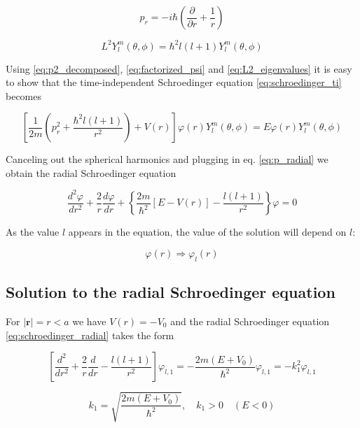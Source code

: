 \documentclass{article}
\begin{document}
\begin{equation}
\label{eq:p_radial}
p_{r} = -i\hbar \left( \frac{\partial}{\partial r} + \frac{1}{r} \right)
\end{equation}

\begin{equation}
\label{eq:L2_eigenvalues}
L^2 Y_{l}^m(\theta, \phi) = \hbar^2 l(l+1) Y_{l}^m(\theta, \phi)
\end{equation}

Using \eqref{eq:p2_decomposed}, \eqref{eq:factorized_psi} and \eqref{eq:L2_eigenvalues} 
it is easy to show that the time-independent Schroedinger equation \eqref{eq:schroedinger_ti} becomes

\begin{equation}
\left[ \frac{1}{2m} \left( p_{r}^2 + \frac{\hbar^2 l(l+1)}{r^2} \right) + V(r) \right] \varphi(r) Y_{l}^m(\theta, \phi) = E \varphi(r) Y_{l}^m(\theta, \phi)
\end{equation}

Canceling out the spherical harmonics and plugging in eq. \eqref{eq:p_radial} we obtain the radial Schroedinger equation

\begin{equation}
\label{eq:schroedinger_radial}
\frac{d^2 \varphi}{dr^2} + \frac{2}{r} \frac{d\varphi}{dr} + \left\{ \frac{2m}{\hbar^2} \left[ E - V(r) \right] - \frac{l \left(l+1 \right)}{r^2} \right\} \varphi = 0
\end{equation}

As the value \(l\) appears in the equation, the value of the solution will depend on \(l\):

\[ \varphi(r) \Rightarrow \varphi_l(r) \]

\subsection{Solution to the radial Schroedinger equation}
For \( \left| \bm{r} \right| = r < a \) we have \( V(r) = -V_0 \) and the radial Schroedinger equation \eqref{eq:schroedinger_radial} takes the form

\begin{equation}
\label{eq:rs_inside_sphere}
\left[ \frac{d^2}{dr^2} + \frac{2}{r} \frac{d}{dr} - \frac{l \left(l+1 \right)}{r^2} \right] \varphi_{l,1} = - \frac{2m(E+V_0)}{\hbar^2} \varphi_{l,1} = -k_1^2 \varphi_{l,1}
\end{equation}

\begin{equation}
k_1 = \sqrt{\frac{2m(E+V_0)}{\hbar^2}}, \quad k_1 > 0 \quad (E<0)
\end{equation}
\end{document}
